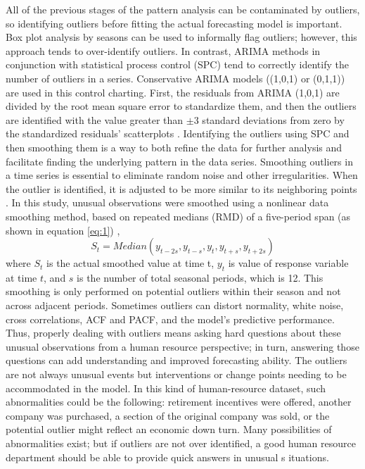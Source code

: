 All of the previous stages of the pattern analysis can be contaminated by outliers, so identifying outliers before fitting the actual forecasting model is important. Box plot analysis by seasons can be used to informally flag outliers; however, this approach tends to over-identify outliers. In contrast, ARIMA methods in conjunction with statistical process control (SPC) tend to correctly identify the number of outliers in a series. Conservative ARIMA models ((1,0,1) or (0,1,1)) are used in this control charting. First, the residuals from ARIMA (1,0,1) are divided by the root mean square error to standardize them, and then the outliers are identified with the value greater than $\pm3$ standard deviations from zero by the standardized residuals' scatterplots  \citep{alwan1988, grznar1997}.
Identifying the outliers using SPC and then smoothing them is a way to both refine the data for further analysis and facilitate finding the underlying pattern in the data series. Smoothing outliers in a time series is essential  to eliminate  random noise and other irregularities. When the outlier is identified, it is adjusted to be more similar to its neighboring points \citep{grznar1997}. In this study, unusual observations were smoothed using a nonlinear data smoothing method, based on repeated medians (RMD) of a five-period span (as shown in equation \ref{eq:1}) \citep{velleman1980},
\begin{equation} \label{eq:1}
	S_t=Median(y_{t-2s},y_{t-s},y_t,y_{t+s},y_{t+2s} ) 
\end{equation}
where $S_t$ is the actual smoothed value at time t, $y_t$ is value of response variable at time $t$, and $s$ is the number of total seasonal periods, which is 12. This smoothing is only performed on potential outliers within their season and not across adjacent periods. Sometimes outliers can distort normality, white noise, cross correlations, ACF and PACF, and the model's predictive performance. Thus, properly dealing with outliers means asking hard questions about these unusual observations from a human resource perspective; in turn, answering those questions can add understanding and improved forecasting ability.    The outliers are not always unusual events but interventions or change points needing  to be accommodated in the model.  In this kind of human-resource dataset, such abnormalities could be the following: retirement incentives were offered, another company was purchased, a section of the original company was sold, or the potential outlier might reflect an economic down turn.  Many possibilities of abnormalities exist; but if outliers are not over identified, a good human resource department should be able to provide quick answers in unusual s ituations.
